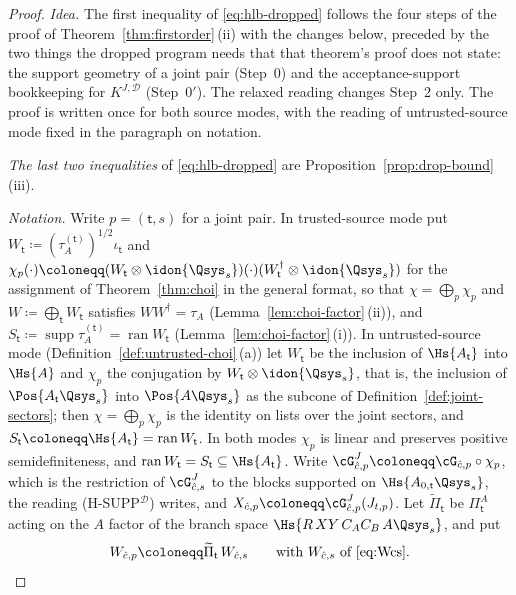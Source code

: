 \begin{proof}
\emph{Idea.} The first inequality of \eqref{eq:hlb-dropped} follows the
four steps of the proof of Theorem~\ref{thm:firstorder}\,(ii) with the
changes below, preceded by the two things the dropped program needs that
that theorem's proof does not state: the support geometry of a joint pair
(Step~0) and the acceptance-support bookkeeping for $K^{J,\mathcal{D}}$
(Step~0$'$). The relaxed reading changes Step~2 only. The proof is
written once for both source modes, with the reading of untrusted-source
mode fixed in the paragraph on notation.

\emph{The last two inequalities} of \eqref{eq:hlb-dropped} are
Proposition~\ref{prop:drop-bound}\,(iii).

\emph{Notation.} Write $p=(\mathsf t,s)$ for a joint pair. In
trusted-source mode put
$W_{\mathsf t}\coloneqq(\tau^{(\mathsf t)}_A)^{1/2}\iota_{\mathsf t}$ and
$\chi_p(\cdot)\coloneqq(W_{\mathsf t}\otimes\idon{\Qsys_s})(\cdot)
(W_{\mathsf t}^{\dagger}\otimes\idon{\Qsys_s})$ for the assignment of
Theorem~\ref{thm:choi} in the general format, so that
$\chi=\bigoplus_p\chi_p$ and $W\coloneqq\bigoplus_{\mathsf t}W_{\mathsf t}$
satisfies $WW^{\dagger}=\tau_A$
(Lemma~\ref{lem:choi-factor}\,(ii)), and
$S_{\mathsf t}\coloneqq\operatorname{supp}\tau^{(\mathsf t)}_A
=\operatorname{ran}W_{\mathsf t}$
(Lemma~\ref{lem:choi-factor}\,(i)). In untrusted-source mode
(Definition~\ref{def:untrusted-choi}\,(a)) let $W_{\mathsf t}$ be the
inclusion of $\Hs{A_{\mathsf t}}$ into $\Hs{A}$ and $\chi_p$ the conjugation
by $W_{\mathsf t}\otimes\idon{\Qsys_s}$, that is, the inclusion of
$\Pos{A_{\mathsf t}\Qsys_s}$ into $\Pos{A\Qsys_s}$ as the subcone of
Definition~\ref{def:joint-sectors}; then $\chi=\bigoplus_p\chi_p$ is the
identity on lists over the joint sectors, and
$S_{\mathsf t}\coloneqq\Hs{A_{\mathsf t}}=\operatorname{ran}W_{\mathsf t}$.
In both modes $\chi_p$ is linear and preserves positive semidefiniteness, and
$\operatorname{ran}W_{\mathsf t}=S_{\mathsf t}\subseteq\Hs{A_{\mathsf t}}$.
Write
$\cG^{J}_{\hat c,p}\coloneqq\cG_{\hat c,p}\circ\chi_p$, which is the
restriction of $\cG^{J}_{\hat c,s}$ to the blocks supported on
$\Hs{A_{0,\mathsf t}\Qsys_s}$, the reading (H-SUPP$^{\mathcal{D}}$) writes,
and $X_{\hat c,p}\coloneqq\cG^{J}_{\hat c,p}(J_{t,p})$. Let
$\widetilde\Pi_{\mathsf t}$ be $\Pi^{A}_{\mathsf t}$ acting on the $A$ factor
of the branch space $\Hs{R\,XY\,C_AC_B\,A\Qsys_s}$, and put
\begin{equation}\label{eq:Wcs-joint}
  W_{\hat c,p}\coloneqq\widetilde\Pi_{\mathsf t}\,W_{\hat c,s}
  \qquad\text{with }W_{\hat c,s}\text{ of }\eqref{eq:Wcs}.
\end{equation}


\end{proof}
